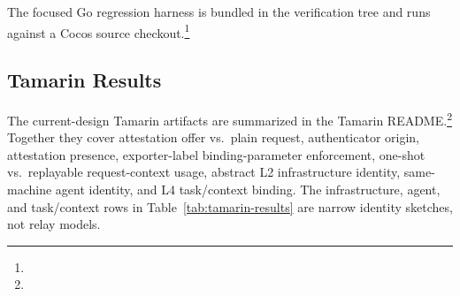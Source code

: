 \documentclass[11pt,a4paper]{article}
\begin{document}
The focused Go regression harness is bundled in the verification tree and runs
against a Cocos source checkout.\footnote{}

\subsection{Tamarin Results}

The current-design Tamarin artifacts are summarized in the Tamarin
README.\footnote{} Together they cover
attestation offer vs.\ plain request, authenticator origin, attestation
presence, exporter-label binding-parameter enforcement, one-shot vs.\ replayable
request-context usage, abstract L2 infrastructure identity, same-machine
agent identity, and L4 task/context binding. The infrastructure, agent, and
task/context rows in
Table~\ref{tab:tamarin-results} are narrow identity sketches, not relay models.
\end{document}
